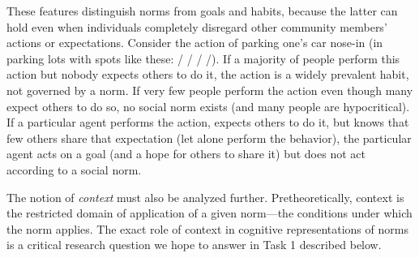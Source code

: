 \documentclass[12pt]{article}
\begin{document}
These features distinguish norms from goals and habits, because the
latter can hold even when individuals completely disregard other
community members' actions or expectations.  Consider the action of
parking one's car nose-in (in parking lots with spots like these: / /
/ /).  If a majority of people perform this action but nobody expects
others to do it, the action is a widely prevalent habit, not governed
by a norm.  If very few people perform the action even though many
expect others to do so, no social norm exists (and many people are
hypocritical).  If a particular agent performs the action, expects
others to do it, but knows that few others share that expectation (let
alone perform the behavior), the particular agent acts on a goal (and
a hope for others to share it) but does not act according to a social
norm.
 
The notion of {\em context} must also be analyzed
further. Pretheoretically, context is the restricted domain of
application of a given norm---the conditions under which the norm
applies. The exact role of context in cognitive representations of
norms is a critical research question we hope to answer in Task 1
described below.
 

\end{document}
